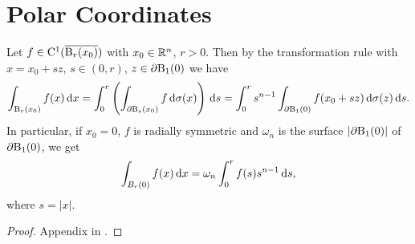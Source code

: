 

\section{Polar Coordinates}

Let $f \in \mathrm{C}^1(\overline{\mathrm{B}_r(x_0)})$ with $x_0 \in \mathbb{R}^n$, $r > 0$. Then by the transformation rule with $x = x_0 + sz$, $s \in (0,r)$, $z \in \partial \mathrm{B}_1(0)$ we have
$$
\int_{\mathrm{B}_r(x_0)} f(x) \, {\operatorname{d}\!{x}} = \int_0^r \left( \int_{\partial \mathrm{B}_s(x_0)} f \, {\operatorname{d}\!{\sigma}}(x) \right) \, {\operatorname{d}\!{s}} = \int_0^r s^{n - 1} \int_{\partial \mathrm{B}_1(0)} f(x_0 + sz) \, {\operatorname{d}\!{\sigma}}(z) \, {\operatorname{d}\!{s}}.
$$
In particular, if $x_0 = 0$, $f$ is radially symmetric and $\omega_n$ is the surface $|\partial \mathrm{B}_1(0)|$ of $\partial \mathrm{B}_1(0)$, we get
$$
\int_{B_r(0)} f(x) \, {\operatorname{d}\!{x}} = \omega_n \int_0^r f(s) s^{n - 1} \, {\operatorname{d}\!{s}},
$$
where $s = |x|$.

\begin{proof}
  Appendix in \cite{evans2010partial}.
\end{proof}
